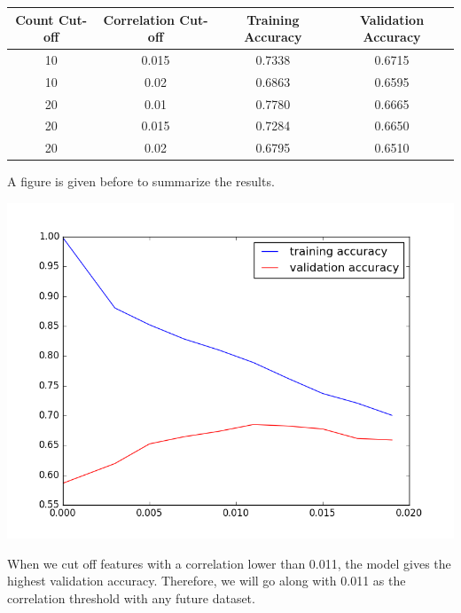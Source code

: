 \documentclass[11pt]{article}
\begin{document}
\begin{center}
\begin{tabular}{| c | c | c | c |}\hline
Count Cut-off & Correlation Cut-off & Training Accuracy & Validation Accuracy \\\hline
	10 & 0.015 & 0.7338 & 0.6715 \\\hline
	10 & 0.02 & 0.6863 & 0.6595 \\\hline
	20 & 0.01 & 0.7780 & 0.6665 \\\hline
	20 & 0.015 & 0.7284 & 0.6650 \\\hline
	20 & 0.02 & 0.6795 & 0.6510 \\\hline
\end{tabular}
\end{center}
A figure is given before to summarize the results.
\begin{center}
\includegraphics[scale=0.6]{big_interval.png}
\end{center}
When we cut off features with a correlation lower than 0.011, the model gives the highest validation accuracy. Therefore, we will go along with 0.011 as the correlation threshold with any future dataset.
\end{document}
